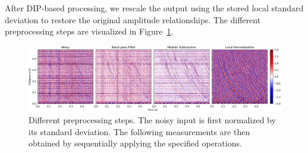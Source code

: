 After DIP-based processing, we rescale the output using the stored local standard deviation to restore the original amplitude relationships.
The different preprocessing steps are visualized in Figure~\ref{fig:preprocessing}.

\begin{figure}
    \centering
    \includegraphics[width=\textwidth]{img/fig_5.3.png}
    \caption{
        Different preprocessing steps.
        The noisy input is first normalized by its standard deviation.
        The following measurements are then obtained by sequentially applying the specified operations.
    }\label{fig:preprocessing}
\end{figure}

